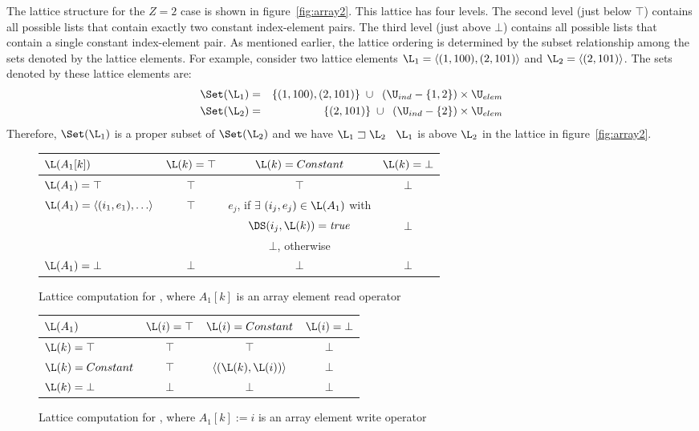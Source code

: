 The lattice structure for the $Z=2$ case is shown in figure~\ref{fig:array2}.  This lattice has four levels.  The second level (just below $\top$)
contains all possible 
lists that contain exactly two constant index-element pairs.  The third level (just above $\bot$) contains all possible 
lists that contain a single constant index-element pair.  
As mentioned earlier,
the lattice ordering is determined by the subset relationship among the sets denoted by the lattice elements.  For example, consider two lattice elements $\L_1 = \langle(1,100), (2,101)\rangle$ and $\L_2 = \langle(2,101)\rangle$.  The sets denoted by these lattice elements are:
\begin{eqnarray*}
\Set(\L_1) & = & \{(1,100), (2, 101)\} \;\cup\;\;
(\U_{ind} - \{1,2\}) \times \U_{elem} \\
\Set(\L_2) & = & \{(2, 101)\} \;\cup\;\;
(\U_{ind} - \{2\}) \times \U_{elem}
\end{eqnarray*}
Therefore, $\Set(\L_1)$ is a proper subset of $\Set(\L_2)$ and we have $\L_1 \sqsupset \L_2$ \ie\ $\L_1$ is above $\L_2$ in the lattice in figure~\ref{fig:array2}.


\begin{figure}%
\begin{center}
\begin{tabular}{|l||c|c|c|}
\hline
$\L(A_1[k])$ & $\L(k) = \top$ & $\L(k) = Constant$ & $\L(k) = \bot$ \\
\hline \hline
$\L(A_1) = \top$ & $\top$ & $\top$ & $\bot$ \\
\hline
$\L(A_1) = \langle (i_1,e_1), \ldots \rangle$ & $\top$ & $e_j$, 
if $\exists$
$(i_j,e_j) \in \L(A_1)$ with &\\
& & $\DS(i_j, \L(k)) = \mbox{\it true}$ & $\bot$\\
& & $\bot$, otherwise & \\
\hline
$\L(A_1) = \bot$ & $\bot$ & $\bot$ & $\bot$ \\
\hline
\end{tabular}
\end{center}
\caption{Lattice computation for ,
where $A_1[k]$ is an 
array element read operator}
\label{fig:aref}
\end{figure}

\begin{figure}%
\begin{center}
\begin{tabular}{|l||c|c|c|}
\hline
$\L(A_1)$ & $\L(i) = \top$ & $\L(i) = Constant$ & $\L(i) = \bot$ \\
\hline \hline
$\L(k) = \top$ & $\top$ & $\top$ & $\bot$ \\
\hline
$\L(k) = Constant$ & $\top$ & $\langle(\L(k),\L(i))\rangle$ & $\bot$ \\
\hline
$\L(k) = \bot$ & $\bot$ & $\bot$ & $\bot$ \\
\hline
\end{tabular}
\end{center}
\caption{Lattice computation for ,
where $A_1[k] := i$ is an 
array element write operator}
\label{fig:adef}
\end{figure}

